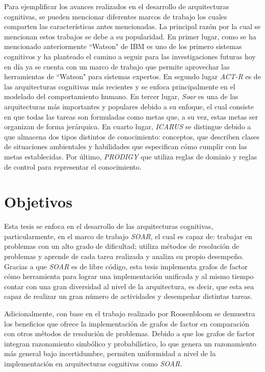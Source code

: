 Para ejemplificar los avances realizados en el desarrollo de arquitecturas cognitivas, se pueden mencionar diferentes marcos de trabajo los cuales comparten las caracter\'{i}sticas antes mencionadas. La principal raz\'{o}n por la cual se mencionan estos trabajos se debe a su popularidad. En primer lugar, como se ha mencionado anteriormente “Watson" de IBM es uno de los primero sistemas cognitivos y ha planteado el camino a seguir para las investigaciones futuras hoy en d\'{i}a ya se cuenta con un marco de trabajo que permite aprovechar las herramientas de “Watson" para sistemas expertos. En segundo lugar \emph{ACT-R} \cite{anderson1997act} es de las arquitecturas cognitivas m\'{a}s recientes y se enfoca principalmente en el modelado del comportamiento humano. En tercer lugar, \emph{Soar} \cite{soar1987} es una de las arquitecturas m\'{a}s importantes y populares debido a su enfoque, el cual consiste en que todas las tareas son formuladas como metas que, a su vez, estas metas ser organizan de forma jer\'{a}rquica. En cuarto lugar, \emph{ICARUS} \cite{langley1991design} se distingue debido a que almacena dos tipos distintos de conocimiento: conceptos, que describen clases de situaciones ambientales y habilidades que especifican c\'{o}mo cumplir con las metas establecidas. Por \'{ultimo}, \emph{PRODIGY} \cite{carbonell1991prodigy} que utiliza reglas de dominio y reglas de control para representar el conocimiento.

\section{Objetivos}

Esta tesis se enfoca en el desarrollo de las arquitecturas cognitivas, particularmente, en el marco de trabajo \emph{SOAR}, el cual es capaz de: trabajar en problemas con un alto grado de dificultad; utiliza m\'{e}todos de resoluci\'{o}n de problemas y aprende de cada tarea realizada y analiza su propio desempe\~no. Gracias a que \emph{SOAR} es de libre c\'{o}digo, esta tesis implementa grafos de factor c\'{o}mo herramienta para lograr una implementaci\'{o}n unificada y al mismo tiempo contar con una gran diversidad al nivel de la arquitectura, es decir, que esta sea capaz de realizar un gran n\'{u}mero de actividades y desempe\~nar distintas tareas.

Adicionalmente, con base en el trabajo realizado por Roosenbloom \cite{rosenbloom2009towards} se demuestra los beneficios que ofrece la implementaci\'{o}n de grafos de factor en comparaci\'{o}n con otros m\'{e}todos de resoluci\'{o}n de problemas. Debido a que los grafos de factor integran razonamiento simb\'{o}lico y probabil\'{i}stico, lo que genera un razonamiento m\'{a}s general bajo incertidumbre, permiten uniformidad a nivel de la implementaci\'{o}n en arquitecturas cognitivas como \emph{SOAR}\cite{rosenbloom2009towards}.


